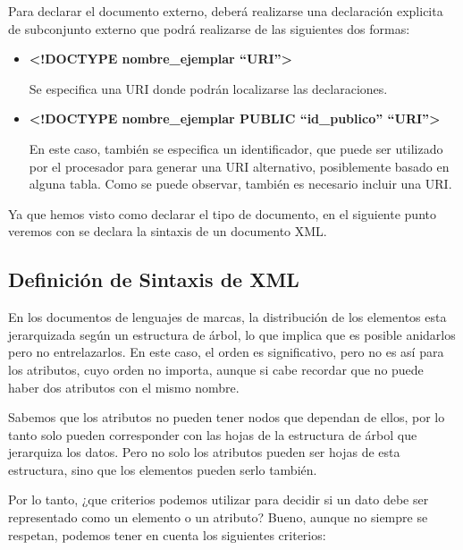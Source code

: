 \begin{itemize}
\begin{itemize}
        Para declarar el documento externo, deberá realizarse una declaración explicita de subconjunto externo que podrá realizarse de las siguientes dos formas:

        \begin{itemize}
            \item \textbf{<!DOCTYPE nombre\_ejemplar ``URI''>}

            Se especifica una URI donde podrán localizarse las declaraciones.

            \item \textbf{<!DOCTYPE nombre\_ejemplar PUBLIC ``id\_publico'' ``URI''>}

            En este caso, también se especifica un identificador, que puede ser utilizado por el procesador para generar una URI alternativo, posiblemente basado en alguna tabla. Como se puede observar, también es necesario incluir una URI.
        \end{itemize}
    \end{itemize}
\end{itemize}

Ya que hemos visto como declarar el tipo de documento, en el siguiente punto veremos con se declara la sintaxis de un documento XML.

\subsection{Definición de Sintaxis de XML}
En los documentos de lenguajes de marcas, la distribución de los elementos esta jerarquizada según un estructura de árbol, lo que implica que es posible anidarlos pero no entrelazarlos. En este caso, el orden es significativo, pero no es así para los atributos, cuyo orden no importa, aunque si cabe recordar que no puede haber dos atributos con el mismo nombre.

Sabemos que los atributos no pueden tener nodos que dependan de ellos, por lo tanto solo pueden corresponder con las hojas de la estructura de árbol que jerarquiza los datos. Pero no solo los atributos pueden ser hojas de esta estructura, sino que los elementos pueden serlo también.

Por lo tanto, ¿que criterios podemos utilizar para decidir si un dato debe ser representado como un elemento o un atributo? Bueno, aunque no siempre se respetan, podemos tener en cuenta los siguientes criterios:


